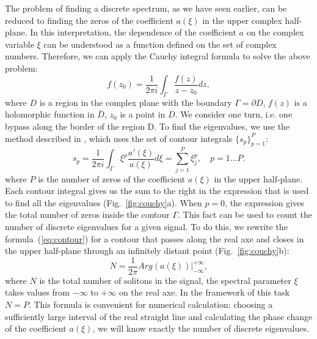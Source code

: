 The problem of finding a discrete spectrum, as we have seen earlier, can be reduced to finding the zeros of the coefficient $ a (\xi) $ in the upper complex half-plane. In this interpretation, the dependence of the coefficient $ a $ on the complex variable $ \xi $ can be understood as a function defined on the set of complex numbers.
Therefore, we can apply the Cauchy integral formula to solve the above problem:
\begin{equation}
    f(z_0) = \frac{1}{2\pi i} \int_{\Gamma} \frac{f(z)}{z - z_0} dz {,}
\end{equation}
where $ D $ is a region in the complex plane with the boundary $ \Gamma = \partial D $, $ f (z) $ is a holomorphic function in $ \bar {D} $, $ z_0 $ is a point in $ D $. 
We consider one turn, i.e. one bypass along  the border of the region D.
To find the eigenvalues, we use the method described in \cite{vasylchenkove2018, delves1967}, which uses the set of contour integrals $ \{s_p \}_{p = 1}^{P} $:
\begin{equation}
    s_p = \frac{1}{2 \pi i} \int_{\Gamma} \xi^p \frac{a'(\xi)}{a(\xi)} d \xi = \sum_{j = 1}^{P} \xi_j^p {,} \quad p = 1 ... P {.}
    \label{eq:contour}
\end{equation}
where $ P $ is the number of zeros of the coefficient $ a (\xi) $ in the upper half-plane. Each contour integral gives us the sum to the right in the expression that is used to find all the eigenvalues (Fig.~\ref{fig:couchy}a). When $ p = 0 $, the expression gives the total number of zeros inside the contour $\Gamma $. This fact can be used to  count the number of discrete eigenvalues for a given signal. To do this, we rewrite the formula~(\ref{eq:contour}) for a contour that passes along the real axe and closes in the upper half-plane through an infinitely distant point (Fig.~\ref{fig:couchy}b):
\begin{equation}
    N = \frac{1}{2 \pi} Arg( a(\xi) ) |^{+\infty}_{-\infty} {,}
    \label{eq:n_soliton_calc}
\end{equation}
where $ N $ is the total number of solitons in the signal, the spectral parameter $ \xi $ takes values from $ - \infty $ to $ + \infty $ on the real axe. In the framework of this task $ N = P $. This formula is convenient for numerical calculation: choosing a sufficiently large interval of the real straight line and calculating the phase change of the coefficient $ a (\xi) $, we will know exactly the number of discrete eigenvalues.


